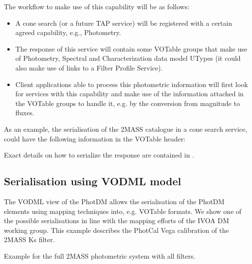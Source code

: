 \documentclass[11pt,a4paper]{ivoa}
\begin{document}
\begin{appendices}
The workflow to make use of this capability will be as follows:
\par

\begin{itemize}
	\item{A cone search (or a future TAP service) will be registered with a
	certain agreed capability, e.g., Photometry.\par}

	\item{The response of this service will contain some VOTable groups that
	make use of Photometry, Spectral and Characterization data model UTypes
	(it could also make use of links to a Filter Profile Service).\par}

	\item{Client applications able to process this photometric information
	will first look for services with this capability and make use of the
	information attached in the VOTable groups to handle it, e.g. by the
	conversion from magnitude to fluxes.}
\end{itemize}\par

As an example, the serialisation of the 2MASS catalogue in a cone search service,
could have the following information in the VOTable header:
\par


Exact details on how to serialize the response are contained in \citep{derriere}.

\subsection{Serialisation using VODML model} \label{appendixmapping}
The VODML view of the PhotDM allows the serialisation of the PhotDM elements
using mapping techniques into, e.g. VOTable formats. We show one of the possible
serialisations in line with the mapping efforts of the IVOA DM working group.
This example describes the PhotCal Vega calibration of the 2MASS Ks filter.
\par



 Example for the full 2MASS photometric system with all filters.



\end{appendices}


\end{document}
